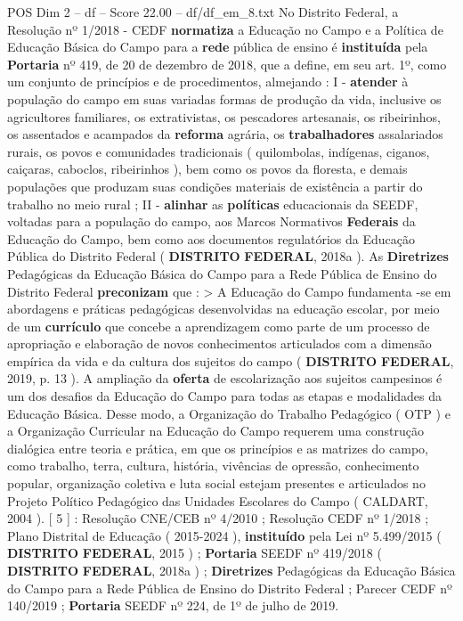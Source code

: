 \begin{textsample}{POS Dim 2 – df – Score 22.00 – df/df\_em\_8.txt}
No Distrito Federal, a Resolução nº 1/2018 - CEDF \textbf{normatiza} a Educação no Campo e a Política de Educação Básica do Campo para a \textbf{rede} pública de ensino é \textbf{instituída} pela \textbf{Portaria} nº 419, de 20 de dezembro de 2018, que a define, em seu art. 1º, como um conjunto de princípios e de procedimentos, almejando : I - \textbf{atender} à população do campo em suas variadas formas de produção da vida, inclusive os agricultores familiares, os extrativistas, os pescadores artesanais, os ribeirinhos, os assentados e acampados da \textbf{reforma} agrária, os \textbf{trabalhadores} assalariados rurais, os povos e comunidades tradicionais ( quilombolas, indígenas, ciganos, caiçaras, caboclos, ribeirinhos ), bem como os povos da floresta, e demais populações que produzam suas condições materiais de existência a partir do trabalho no meio rural ; II - \textbf{alinhar} as \textbf{políticas} educacionais da SEEDF, voltadas para a população do campo, aos Marcos Normativos \textbf{Federais} da Educação do Campo, bem como aos documentos regulatórios da Educação Pública do Distrito Federal ( \textbf{DISTRITO} \textbf{FEDERAL}, 2018a ).
As \textbf{Diretrizes} Pedagógicas da Educação Básica do Campo para a Rede Pública de Ensino do Distrito Federal \textbf{preconizam} que : > A Educação do Campo fundamenta -se em abordagens e práticas pedagógicas desenvolvidas na educação escolar, por meio de um \textbf{currículo} que concebe a aprendizagem como parte de um processo de apropriação e elaboração de novos conhecimentos articulados com a dimensão empírica da vida e da cultura dos sujeitos do campo ( \textbf{DISTRITO} \textbf{FEDERAL}, 2019, p. 13 ).
A ampliação da \textbf{oferta} de escolarização aos sujeitos campesinos é um dos desafios da Educação do Campo para todas as etapas e modalidades da Educação Básica.
Desse modo, a Organização do Trabalho Pedagógico ( OTP ) e a Organização Curricular na Educação do Campo requerem uma construção dialógica entre teoria e prática, em que os princípios e as matrizes do campo, como trabalho, terra, cultura, história, vivências de opressão, conhecimento popular, organização coletiva e luta social estejam presentes e articulados no Projeto Político Pedagógico das Unidades Escolares do Campo ( CALDART, 2004 ). [ 5 ] : Resolução CNE/CEB nº 4/2010 ; Resolução CEDF nº 1/2018 ; Plano Distrital de Educação ( 2015-2024 ), \textbf{instituído} pela Lei nº 5.499/2015 ( \textbf{DISTRITO} \textbf{FEDERAL}, 2015 ) ; \textbf{Portaria} SEEDF nº 419/2018 ( \textbf{DISTRITO} \textbf{FEDERAL}, 2018a ) ; \textbf{Diretrizes} Pedagógicas da Educação Básica do Campo para a Rede Pública de Ensino do Distrito Federal ; Parecer CEDF nº 140/2019 ; \textbf{Portaria} SEEDF nº 224, de 1º de julho de 2019.

\end{textsample}
